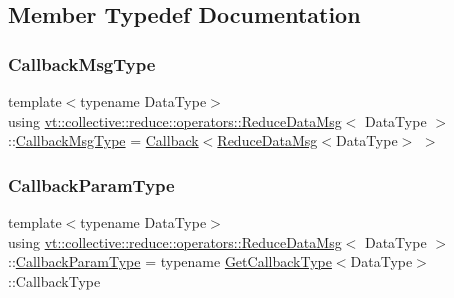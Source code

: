 \subsection{Member Typedef Documentation}
\mbox{\label{structvt_1_1collective_1_1reduce_1_1operators_1_1_reduce_data_msg_aa65f18bb2f7493d54e4b776787b7405c}} 
\subsubsection{\texorpdfstring{Callback\+Msg\+Type}{CallbackMsgType}}
{\footnotesize\ttfamily template$<$typename Data\+Type$>$ \\
using \hyperlink{structvt_1_1collective_1_1reduce_1_1operators_1_1_reduce_data_msg}{vt\+::collective\+::reduce\+::operators\+::\+Reduce\+Data\+Msg}$<$ Data\+Type $>$\+::\hyperlink{structvt_1_1collective_1_1reduce_1_1operators_1_1_reduce_data_msg_aa65f18bb2f7493d54e4b776787b7405c}{Callback\+Msg\+Type} =  \hyperlink{namespacevt_a57b238783d05de96bc2c4027f7073b7f}{Callback}$<$\hyperlink{structvt_1_1collective_1_1reduce_1_1operators_1_1_reduce_data_msg}{Reduce\+Data\+Msg}$<$Data\+Type$>$ $>$}

\mbox{\label{structvt_1_1collective_1_1reduce_1_1operators_1_1_reduce_data_msg_a4a0c225ffa4221beb2bfba11ac33e5b6}} 
\subsubsection{\texorpdfstring{Callback\+Param\+Type}{CallbackParamType}}
{\footnotesize\ttfamily template$<$typename Data\+Type$>$ \\
using \hyperlink{structvt_1_1collective_1_1reduce_1_1operators_1_1_reduce_data_msg}{vt\+::collective\+::reduce\+::operators\+::\+Reduce\+Data\+Msg}$<$ Data\+Type $>$\+::\hyperlink{structvt_1_1collective_1_1reduce_1_1operators_1_1_reduce_data_msg_a4a0c225ffa4221beb2bfba11ac33e5b6}{Callback\+Param\+Type} =  typename \hyperlink{structvt_1_1collective_1_1reduce_1_1operators_1_1_get_callback_type}{Get\+Callback\+Type}$<$Data\+Type$>$\+::Callback\+Type}

